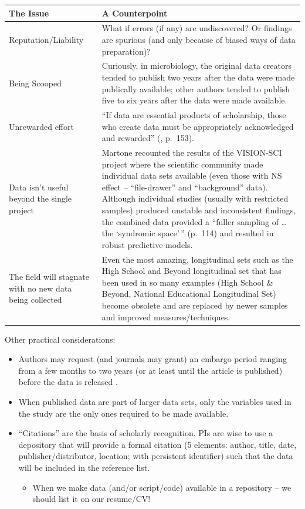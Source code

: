 \documentclass[
  english,
]{book}
\providecommand{\tightlist}{%
  \setlength{\itemsep}{0pt}\setlength{\parskip}{0pt}}
\begin{document}
\begin{longtable}[]{@{}
  >{\raggedright\arraybackslash}p{}
  >{\raggedright\arraybackslash}p{}@{}}
\toprule
The Issue & A Counterpoint \\
\midrule
\endhead
Reputation/Liability & What if errors (if any) are undiscovered? Or findings are spurious (and only because of biased ways of data preparation)? \\
Being Scooped & Curiously, in microbiology, the original data creators tended to publish two years after the data were made publically available; other authors tended to publish five to six years after the data were made available. \\
Unrewarded effort & ``If data are essential products of scholarship, those who create data must be appropriately acknowledged and rewarded'' (\citep{alter_responsible_2018}, p.~153). \\
Data isn't useful beyond the single project & Martone \citep{martone_data_2018} recounted the results of the VISION-SCI project where the scientific community made individual data sets available (even those with NS effect -- ``file-drawer'' and ``background'' data). Although individual studies (usually with restricted samples) produced unstable and inconsistent findings, the combined data provided a ``fuller sampling of \ldots the `syndromic space'\,'' (p.~114) and resulted in robust predictive models. \\
The field will stagnate with no new data being collected & Even the most amazing, longitudinal sets such as the High School and Beyond longitudinal set that has been used in so many examples \citep{noauthor_high_nodate}(High School \& Beyond, National Educational Longitudinal Set) become obsolete and are replaced by newer samples and improved measures/techniques. \\
\bottomrule
\end{longtable}

Other practical considerations:

\begin{itemize}
\tightlist
\item
  Authors may request (and journals may grant) an embargo period ranging from a few months to two years (or at least until the article is published) before the data is released \citep{martone_data_2018}.
\item
  When published data are part of larger data sets, only the variables used in the study are the only ones required to be made available.
\item
  ``Citations'' are the basis of scholarly recognition. PIs are wise to use a depository that will provide a formal citation (5 elements: author, title, date, publisher/distributor, location; with persistent identifier) such that the data will be included in the reference list.

  \begin{itemize}
  \tightlist
  \item
    When we make data (and/or script/code) available in a repository -- we should list it on our resume/CV!
  \end{itemize}
\end{itemize}
\end{document}
